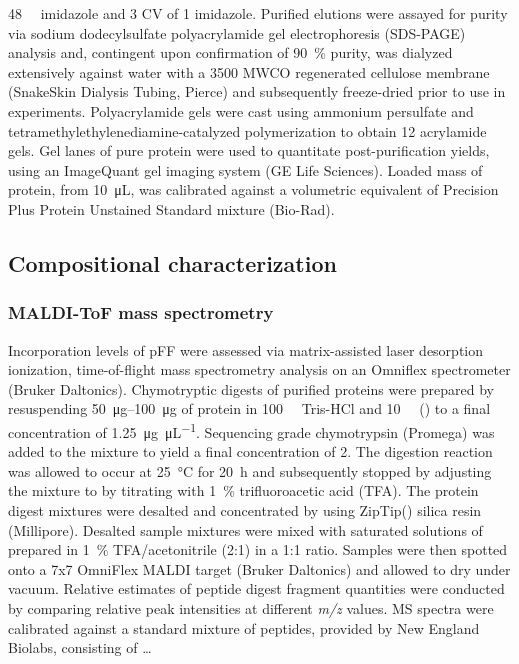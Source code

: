 \begin{refsection}
\SI{48}{\milli\moLar} imidazole and 3 CV of \SI{1}{\moLar} imidazole.  Purified
elutions were assayed for purity via sodium dodecylsulfate polyacrylamide gel
electrophoresis (SDS-PAGE) analysis and, contingent upon confirmation of
\SI{90}{\percent} purity, was dialyzed extensively against water with a 3500
MWCO regenerated cellulose membrane (SnakeSkin Dialysis Tubing, Pierce) and
subsequently freeze-dried prior to use in experiments. Polyacrylamide gels were
cast using ammonium persulfate and tetramethylethylenediamine-catalyzed
polymerization to obtain \SI{12}{\wtper} acrylamide gels. Gel lanes of pure
protein were used to quantitate post-purification yields, using an ImageQuant
gel imaging system (GE Life Sciences). Loaded mass of protein, from
\SI{10}{\uL}, was calibrated against a volumetric equivalent of Precision Plus
Protein Unstained Standard mixture (Bio-Rad).

\subsection{Compositional characterization}
\subsubsection{MALDI-ToF mass spectrometry}

Incorporation levels of pFF were assessed via matrix-assisted laser desorption
ionization, time-of-flight mass spectrometry analysis on an Omniflex
spectrometer (Bruker Daltonics). Chymotryptic digests of purified proteins were
prepared by resuspending \SIrange[range-phrase=--]{50}{100}{\ug} of protein in
\SI{100}{\milli\moLar} Tris-HCl and \SI{10}{\milli\moLar}  ()
to a final concentration of \SI{1.25}{\ug\per\uL}. Sequencing grade chymotrypsin
(Promega) was added to the mixture to yield a final concentration of
\SI{2}{\wtperwt}. The digestion reaction was allowed to occur at \SI{25}{\celsius}
for \SI{20}{\hour} and subsequently stopped by adjusting the mixture to  by
titrating with \SI{1}{\percent} trifluoroacetic acid (TFA). The protein digest
mixtures were desalted and concentrated by using ZipTip() silica resin
(Millipore).  Desalted sample mixtures were mixed with saturated solutions of
 prepared in \SI{1}{\percent}
TFA/acetonitrile (2:1) in a 1:1 ratio. Samples were then spotted onto a 7x7
OmniFlex MALDI target (Bruker Daltonics) and allowed to dry under vacuum.
Relative estimates of peptide digest fragment quantities were conducted by
comparing relative peak intensities at different \emph{m/z} values. MS spectra
were calibrated against a standard mixture of peptides, provided by New England
Biolabs, consisting of \ldots


\end{refsection}
